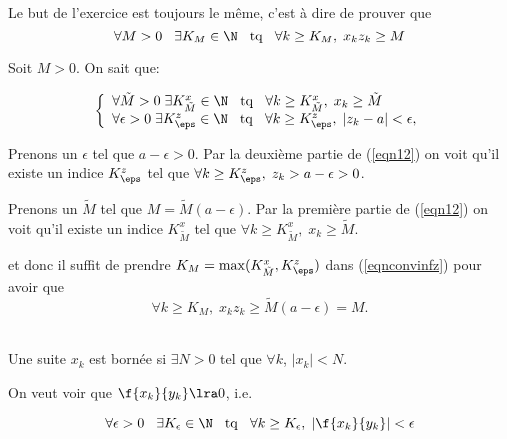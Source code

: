 Le but de l'exercice est toujours le même, c'est à dire de prouver que 
\begin{equation}		\label{eqnconvinfz}
  \forall M > 0 \hspace{0.3cm} \exists K_M \in \N \hspace{0.3cm} {\rm tq} \hspace{0.3cm} \forall k \geq K_M, \;x_k  z_k \geq M 
\end{equation}

\noindent Soit $M>0$. On sait  que:

\begin{equation}
\label{eqn12}\left\{\begin{array}{l}   
        \forall \tilde{M} >0 \;\exists K^x_{\tilde{M}} \in \N \hspace{0.3cm} {\rm tq} \hspace{0.3cm} \forall k \geq K^x_{\tilde{M}},\; x_k \geq  \tilde{M} \\																		 
       \forall \epsilon >0\;\exists K^z_\eps \in \N \hspace{0.3cm} {\rm tq} \hspace{0.3cm} \forall k \geq K^z_\eps,\; |z_k-a| <\epsilon,																		
\end{array}\right.\end{equation}

\noindent Prenons un $\epsilon$ tel que $a-\epsilon>0$. Par la deuxième partie de (\ref{eqn12}) on voit qu'il existe un indice $ K^z_\eps$ tel que $ \forall k \geq K^z_\eps,\; z_k > a-\epsilon >0$.

\noindent Prenons un $\tilde{M}$ tel que $M= \tilde{M}(a-\epsilon)$. Par la première partie de (\ref{eqn12}) on voit qu'il existe un indice $ K^x_{\tilde{M}} $ tel que $\forall k \geq K^x_{\tilde{M}},\; x_k \geq  \tilde{M} $.

												
\noindent et donc il suffit  de prendre  $K_M = \max(K_{\tilde{M}}^x, K^z_\eps)$ dans (\ref{eqnconvinfz}) pour avoir que 
\[ \forall k \geq K_M, \;x_k  z_k \geq \tilde{M}(a-\epsilon)=M.\]


\\

\noindent Une suite $x_k$ est bornée si $\exists N>0$ tel que $\forall k$, $|x_k| < N$.

\noindent On veut voir que $\f{x_k}{y_k}\lra 0$, i.e.

\begin{equation} 
\label{eqnconvborne}  \forall  \epsilon > 0 \hspace{0.3cm} \exists K_\epsilon \in \N \hspace{0.3cm} {\rm tq} \hspace{0.3cm} \forall k \geq K_\epsilon, \; |\f{x_k}{y_k}| < \epsilon \end{equation}

